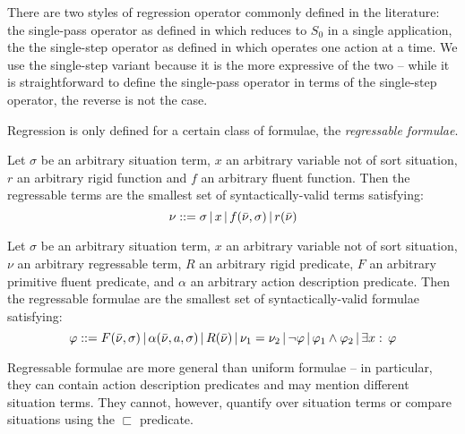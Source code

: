 There are two styles of regression operator commonly defined in the
literature: the single-pass operator as defined in \citep{pirri99contributions_sitcalc}
which reduces to $S_{0}$ in a single application, the the single-step
operator as defined in \citep{scherl03sc_knowledge} which operates
one action at a time. We use the single-step variant because it is
the more expressive of the two -- while it is straightforward to define
the single-pass operator in terms of the single-step operator, the
reverse is not the case.

Regression is only defined for a certain class of formulae, the \emph{regressable
formulae}.

\begin{defnL}
 Let $\sigma$ be an arbitrary situation
term, $x$ an arbitrary variable not of sort situation, $r$ an arbitrary
rigid function and $f$ an arbitrary fluent function. Then the regressable
terms are the smallest set of syntactically-valid terms satisfying:
\[
\nu::=\sigma\,|\, x\,|\, f(\bar{\nu},\sigma)\,|\, r(\bar{\nu})\]

\begin{defnL}
 \label{def:Background:Regressable-Formulae}Let
$\sigma$ be an arbitrary situation term, $x$ an arbitrary variable
not of sort situation, $\nu$ an arbitrary regressable term, $R$
an arbitrary rigid predicate, $F$ an arbitrary primitive fluent predicate,
and $\alpha$ an arbitrary action description predicate. Then the
regressable formulae are the smallest set of syntactically-valid formulae
satisfying: \[
\varphi::=F(\bar{\nu},\sigma)\,|\,\alpha(\bar{\nu},a,\sigma)\,|\, R(\bar{\nu})\,|\,\nu_{1}=\nu_{2}\,|\,\neg\varphi\,|\,\varphi_{1}\wedge\varphi_{2}\,|\,\exists x:\,\varphi\]

\end{defnL}
\end{defnL}
Regressable formulae are more general than uniform formulae -- in
particular, they can contain action description predicates and may
mention different situation terms. They cannot, however, quantify
over situation terms or compare situations using the $\sqsubset$
predicate.

